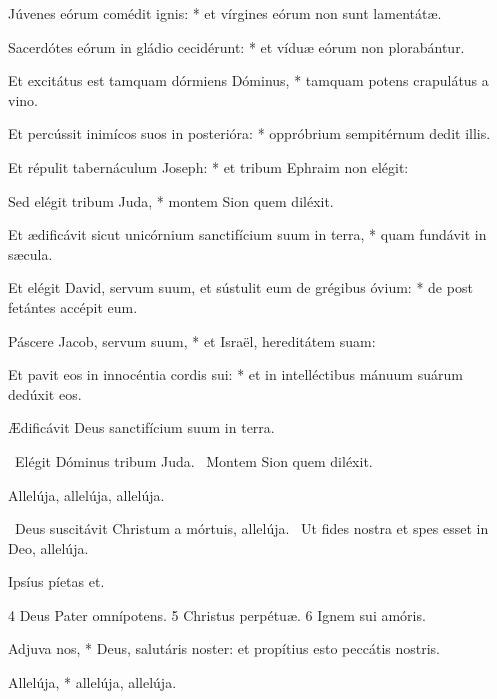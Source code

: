 Júvenes eórum comédit ignis: * et vírgines eórum non sunt lamentátæ.

Sacerdótes eórum in gládio cecidérunt: * et víduæ eórum non plorabántur.

Et excitátus est tamquam dórmiens Dóminus, * tamquam potens crapulátus a vino.

Et percússit inimícos suos in posterióra: * oppróbrium sempitérnum dedit illis.

Et répulit tabernáculum Joseph: * et tribum Ephraim non elégit:

Sed elégit tribum Juda, * montem Sion quem diléxit.

Et ædificávit sicut unicórnium sanctifícium suum in terra, * quam fundávit in sæcula.

Et elégit David, servum suum, et sústulit eum de grégibus óvium: * de post fetántes accépit eum.

Páscere Jacob, servum suum, * et Israël, hereditátem suam:

Et pavit eos in innocéntia cordis sui: * et in intelléctibus mánuum suárum dedúxit eos.

 Ædificávit Deus sanctifícium suum in terra.

\sectionornament



\V\ Elégit Dóminus tribum Juda. \R\ Montem Sion quem diléxit.



 Allelúja, allelúja, allelúja.

\V\ Deus suscitávit Christum a mórtuis, allelúja. \R\ Ut fides nostra et spes esset in Deo, allelúja.

 Ipsíus píetas et.

 4 Deus Pater omnípotens. 5 Christus perpétuæ. 6 Ignem sui amóris.



 Adjuva nos, * Deus, salutáris noster: et propítius esto peccátis nostris.


 Allelúja, * allelúja, allelúja.

